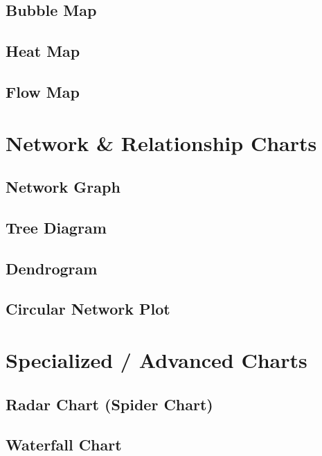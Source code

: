\documentclass[
  letterpaper,
  DIV=11,
  numbers=noendperiod]{scrreprt}
\begin{document}
\subsection{Bubble Map}\label{bubble-map}

\subsection{Heat Map}\label{heat-map}

\subsection{Flow Map}\label{flow-map}

\section{Network \& Relationship
Charts}\label{network-relationship-charts}

\subsection{Network Graph}\label{network-graph}

\subsection{Tree Diagram}\label{tree-diagram}

\subsection{Dendrogram}\label{dendrogram}

\subsection{Circular Network Plot}\label{circular-network-plot}

\section{Specialized / Advanced
Charts}\label{specialized-advanced-charts}

\subsection{Radar Chart (Spider Chart)}\label{radar-chart-spider-chart}

\subsection{Waterfall Chart}\label{waterfall-chart}
\end{document}
